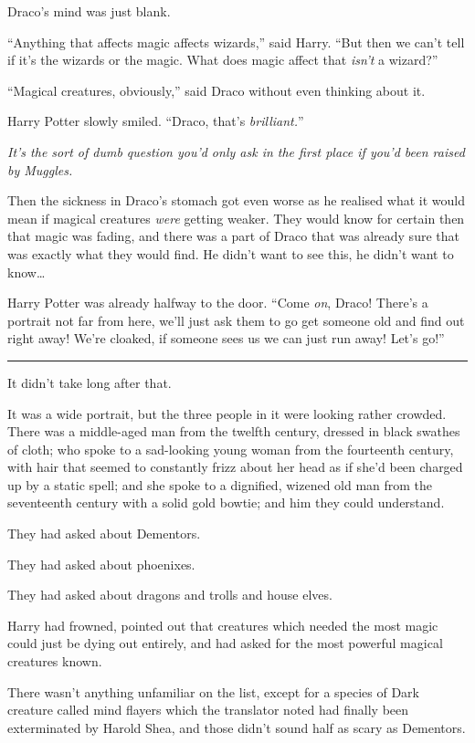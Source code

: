 Draco's mind was just blank.

``Anything that affects magic affects wizards,'' said Harry. ``But then
we can't tell if it's the wizards or the magic. What does magic affect
that \emph{isn't} a wizard?''

``Magical creatures, obviously,'' said Draco without even thinking about
it.

Harry Potter slowly smiled. ``Draco, that's \emph{brilliant.}''

\emph{It's the sort of dumb question you'd only ask in the first place
if you'd been raised by Muggles.}

Then the sickness in Draco's stomach got even worse as he realised what
it would mean if magical creatures \emph{were} getting weaker. They
would know for certain then that magic was fading, and there was a part
of Draco that was already sure that was exactly what they would find. He
didn't want to see this, he didn't want to know\ldots{}

Harry Potter was already halfway to the door. ``Come \emph{on}, Draco!
There's a portrait not far from here, we'll just ask them to go get
someone old and find out right away! We're cloaked, if someone sees us
we can just run away! Let's go!''

\begin{center}\rule{3in}{0.4pt}\end{center}

It didn't take long after that.

It was a wide portrait, but the three people in it were looking rather
crowded. There was a middle-aged man from the twelfth century, dressed
in black swathes of cloth; who spoke to a sad-looking young woman from
the fourteenth century, with hair that seemed to constantly frizz about
her head as if she'd been charged up by a static spell; and she spoke to
a dignified, wizened old man from the seventeenth century with a solid
gold bowtie; and him they could understand.

They had asked about Dementors.

They had asked about phoenixes.

They had asked about dragons and trolls and house elves.

Harry had frowned, pointed out that creatures which needed the most
magic could just be dying out entirely, and had asked for the most
powerful magical creatures known.

There wasn't anything unfamiliar on the list, except for a species of
Dark creature called mind flayers which the translator noted had finally
been exterminated by Harold Shea, and those didn't sound half as scary
as Dementors.

